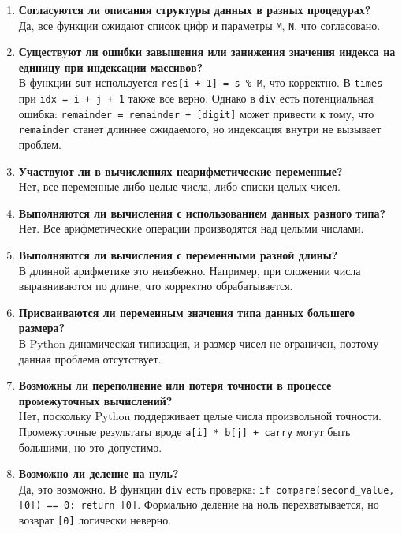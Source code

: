\documentclass{article}[14pt]
\begin{document}
\begin{enumerate}
\item \textbf{Согласуются ли описания структуры данных в разных процедурах?}
\\
Да, все функции ожидают список цифр и параметры \texttt{M}, \texttt{N}, что согласовано.

\item \textbf{Существуют ли ошибки завышения или занижения значения индекса на единицу при индексации массивов?}
\\
В функции \texttt{sum} используется \texttt{res[i + 1] = s \% M}, что корректно. В \texttt{times} при \texttt{idx = i + j + 1} также все верно. Однако в \texttt{div} есть потенциальная ошибка: \texttt{remainder = remainder + [digit]} может привести к тому, что \texttt{remainder} станет длиннее ожидаемого, но индексация внутри не вызывает проблем.

\item \textbf{Участвуют ли в вычислениях неарифметические переменные?}
\\
Нет, все переменные либо целые числа, либо списки целых чисел.

\item \textbf{Выполняются ли вычисления с использованием данных разного типа?}
\\
Нет. Все арифметические операции производятся над целыми числами.

\item \textbf{Выполняются ли вычисления с переменными разной длины?}
\\
В длинной арифметике это неизбежно. Например, при сложении числа выравниваются по длине, что корректно обрабатывается.

\item \textbf{Присваиваются ли переменным значения типа данных большего размера?}
\\
В Python динамическая типизация, и размер чисел не ограничен, поэтому данная проблема отсутствует.

\item \textbf{Возможны ли переполнение или потеря точности в процессе промежуточных вычислений?}
\\
Нет, поскольку Python поддерживает целые числа произвольной точности. Промежуточные результаты вроде \texttt{a[i] * b[j] + carry} могут быть большими, но это допустимо.

\item \textbf{Возможно ли деление на нуль?}
\\
Да, это возможно. В функции \texttt{div} есть проверка: \texttt{if compare(second\_value, [0]) == 0: return [0]}. Формально деление на ноль перехватывается, но возврат \texttt{[0]} логически неверно.


\end{enumerate}
\end{document}
